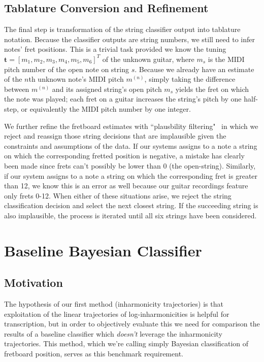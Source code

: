 \documentclass[12pt]{cmuthesis}
\begin{document}
\subsection{Tablature Conversion and Refinement}
The final step is transformation of the string classifier output into tablature notation. Because the classifier outputs are string numbers, we still need to infer notes' fret positions. This is a trivial task provided we know the tuning $\mathbf{t} = [m_1, m_2, m_3, m_4, m_5, m_6]^T$ of the unknown guitar, where $m_s$ is the MIDI pitch number of the open note on string $s$. Because we already have an estimate of the $n$th unknown note's MIDI pitch $m^{(n)}$, simply taking the difference between $m^{(n)}$ and its assigned string's open pitch $m_s$ yields the fret on which the note was played; each fret on a guitar increases the string's pitch by one half-step, or equivalently the MIDI pitch number by one integer.

We further refine the fretboard estimates with ``plausbility filtering"~\cite{abesser2012} in which we reject and reassign those string decisions that are implausible given the constraints and assumptions of the data. If our systems assigns to a note a string on which the corresponding fretted position is negative, a mistake has clearly been made since frets can't possibly be lower than 0 (the open-string). Similarly, if our system assigns to a note a string on which the corresponding fret is greater than 12, we know this is an error as well because our guitar recordings feature only frets 0-12. When either of these situations arise, we reject the string classification decision and select the next closest string. If the succeeding string is also implausible, the process is iterated until all six strings have been considered.

\section{Baseline Bayesian Classifier}
\subsection{Motivation}
The hypothesis of our first method (inharmonicity trajectories) is that exploitation of the linear trajectories of log-inharmonicities is helpful for transcription, but in order to objectively evaluate this we need for comparison the results of a baseline classifier which \textit{doesn't} leverage the inharmonicity trajectories. This method, which we're calling simply Bayesian classification of fretboard position, serves as this benchmark requirement. 
\end{document}
